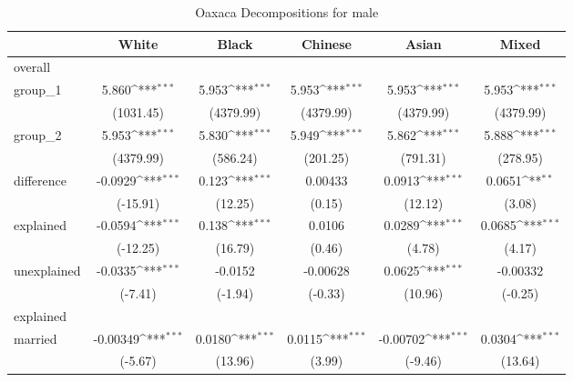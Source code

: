 \begin{table}[htbp]\centering
\def\sym#1{\ifmmode^{#1}\else\(^{#1}\)\fi}
\caption{Oaxaca Decompositions for male\label{tab1}}
\begin{tabular}{l*{5}{c}}
\hline\hline
            &\multicolumn{1}{c}{White}&\multicolumn{1}{c}{Black}&\multicolumn{1}{c}{Chinese}&\multicolumn{1}{c}{Asian}&\multicolumn{1}{c}{Mixed}\\
\hline
overall     &                     &                     &                     &                     &                     \\
group\_1     &       5.860\sym{***}&       5.953\sym{***}&       5.953\sym{***}&       5.953\sym{***}&       5.953\sym{***}\\
            &   (1031.45)         &   (4379.99)         &   (4379.99)         &   (4379.99)         &   (4379.99)         \\
group\_2     &       5.953\sym{***}&       5.830\sym{***}&       5.949\sym{***}&       5.862\sym{***}&       5.888\sym{***}\\
            &   (4379.99)         &    (586.24)         &    (201.25)         &    (791.31)         &    (278.95)         \\
difference  &     -0.0929\sym{***}&       0.123\sym{***}&     0.00433         &      0.0913\sym{***}&      0.0651\sym{**} \\
            &    (-15.91)         &     (12.25)         &      (0.15)         &     (12.12)         &      (3.08)         \\
explained   &     -0.0594\sym{***}&       0.138\sym{***}&      0.0106         &      0.0289\sym{***}&      0.0685\sym{***}\\
            &    (-12.25)         &     (16.79)         &      (0.46)         &      (4.78)         &      (4.17)         \\
unexplained &     -0.0335\sym{***}&     -0.0152         &    -0.00628         &      0.0625\sym{***}&    -0.00332         \\
            &     (-7.41)         &     (-1.94)         &     (-0.33)         &     (10.96)         &     (-0.25)         \\
\hline
explained   &                     &                     &                     &                     &                     \\
married     &    -0.00349\sym{***}&      0.0180\sym{***}&      0.0115\sym{***}&    -0.00702\sym{***}&      0.0304\sym{***}\\
            &     (-5.67)         &     (13.96)         &      (3.99)         &     (-9.46)         &     (13.64)         \\

\end{tabular}
\end{table}
